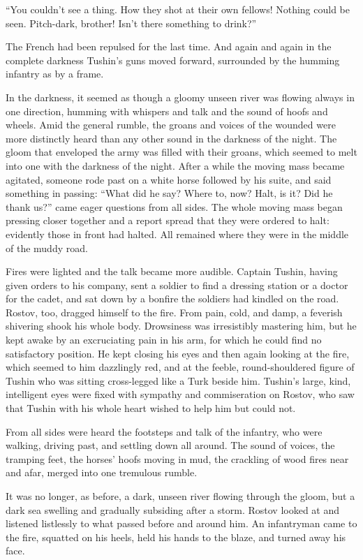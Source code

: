 ``You couldn't see a thing. How they shot at their own fellows!
Nothing could be seen. Pitch-dark, brother! Isn't there something
to drink?''

The French had been repulsed for the last time. And again and
again in the complete darkness Tushin's guns moved forward,
surrounded by the humming infantry as by a frame.

In the darkness, it seemed as though a gloomy unseen river was
flowing always in one direction, humming with whispers and talk
and the sound of hoofs and wheels. Amid the general rumble, the
groans and voices of the wounded were more distinctly heard than
any other sound in the darkness of the night. The gloom that
enveloped the army was filled with their groans, which seemed to
melt into one with the darkness of the night.  After a while the
moving mass became agitated, someone rode past on a white horse
followed by his suite, and said something in passing: ``What did
he say? Where to, now? Halt, is it? Did he thank us?'' came eager
questions from all sides. The whole moving mass began pressing
closer together and a report spread that they were ordered to
halt: evidently those in front had halted. All remained where
they were in the middle of the muddy road.

Fires were lighted and the talk became more audible. Captain
Tushin, having given orders to his company, sent a soldier to
find a dressing station or a doctor for the cadet, and sat down
by a bonfire the soldiers had kindled on the road. Rostov, too,
dragged himself to the fire. From pain, cold, and damp, a
feverish shivering shook his whole body. Drowsiness was
irresistibly mastering him, but he kept awake by an excruciating
pain in his arm, for which he could find no satisfactory
position. He kept closing his eyes and then again looking at the
fire, which seemed to him dazzlingly red, and at the feeble,
round-shouldered figure of Tushin who was sitting cross-legged
like a Turk beside him.  Tushin's large, kind, intelligent eyes
were fixed with sympathy and commiseration on Rostov, who saw
that Tushin with his whole heart wished to help him but could
not.

From all sides were heard the footsteps and talk of the infantry,
who were walking, driving past, and settling down all around. The
sound of voices, the tramping feet, the horses' hoofs moving in
mud, the crackling of wood fires near and afar, merged into one
tremulous rumble.

It was no longer, as before, a dark, unseen river flowing through
the gloom, but a dark sea swelling and gradually subsiding after
a storm.  Rostov looked at and listened listlessly to what passed
before and around him. An infantryman came to the fire, squatted
on his heels, held his hands to the blaze, and turned away his
face.

